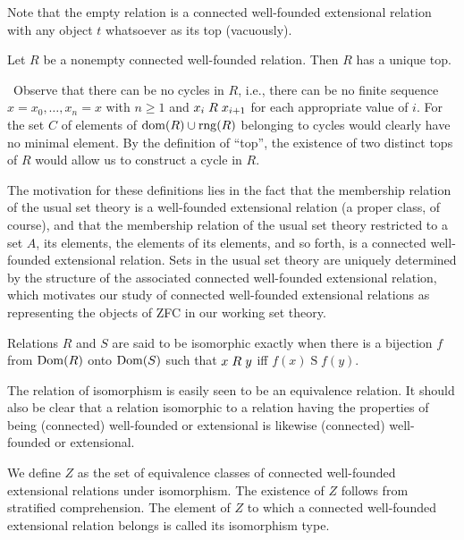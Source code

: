 Note that the empty relation is a connected well-founded
extensional relation with any object $t$ whatsoever as its top (vacuously).

\begin{lemme}
 Let $R$ be a nonempty connected well-founded
 relation.  Then $R$ has a unique top.
\end{lemme}

\preuve\ Observe that there can be no cycles in $R$, i.e., there can be no
finite sequence $x=x_0,\ldots,x_n=x$ with $n \geq 1$ and
$x_i \mathrel{R} x_{i+1}$ for each appropriate value of $i$.  For the set
$C$ of elements of $\mathop{\mathrm{dom}}(R)\cup \mathop{\mathrm{rng}}(R)$ belonging to cycles would
clearly have no minimal element.  By the definition of ``top'', the
existence of two distinct tops of $R$ would allow us to construct a
cycle in $R$.
\finpreuve

The motivation for these definitions lies in the fact that the
membership relation of the usual set
theory is a well-founded
extensional relation (a
proper class, of course), and that the membership relation of the usual set
theory restricted to a set $A$, its elements, the elements of its elements, and
so forth, is a connected well-founded extensional
relation.  Sets in the usual
set theory are uniquely determined by the structure of the associated
connected well-founded extensional relation, which motivates our study
of connected well-founded extensional relations as representing the
objects of ZFC in our working set theory.

\begin{definition}
 Relations $R$ and $S$ are said to be {\upshape
 isomorphic} exactly when there is a bijection $f$ from $\mathop{\mathrm{Dom}}(R)$
 onto $\mathop{\mathrm{Dom}}(S)$ such that $x\mathrel{R} y$ iff $f(x) \mathrel{S} f(y)$.
\end{definition}

The relation of isomorphism is easily seen to be an equivalence
relation.  It should also be
clear that a relation isomorphic to a relation having the properties of being
(connected) well-founded or extensional is likewise (connected) well-founded or
extensional.


\begin{definition}
 We define $Z$ as the set of equivalence classes of connected well-founded extensional
 relations under
 isomorphism.  The   existence of $Z$ follows from
 stratified comprehension.  The
 element of $Z$ to which a connected well-founded extensional relation
 belongs is called its {\upshape isomorphism type}.
\end{definition}


